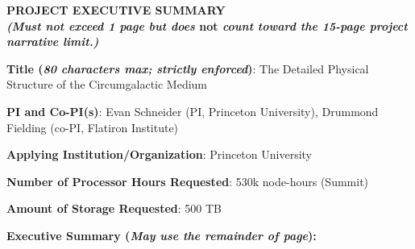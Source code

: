 \documentclass[11pt,letterpaper,english]{article}
\begin{document}
\setlength{\parindent}{0in} %

\pagestyle{fancy}   \renewcommand{%
\headrulewidth}{0.0pt}

\begin{center}
\bf {PROJECT EXECUTIVE SUMMARY} \\
{\bf \small {\em (Must not exceed 1 page but does} not {\em count toward the 15-page project narrative limit.)}}
\end{center}


\bigskip

\textbf{Title (\emph{80 characters max; strictly enforced})}: The Detailed Physical Structure of the Circumgalactic Medium \smallskip

\textbf{PI and Co-PI(s)}: Evan Schneider (PI, Princeton University), Drummond Fielding (co-PI, Flatiron Institute) \smallskip

\textbf{Applying Institution/Organization}: Princeton University \smallskip

\textbf{Number of Processor Hours Requested}: 530k node-hours (Summit) \smallskip

\textbf{Amount of Storage Requested}: 500 TB \smallskip

\textbf{Executive Summary ({\emph{May use the remainder of page}}):} \\

\vspace{.15in}





\end{document}
